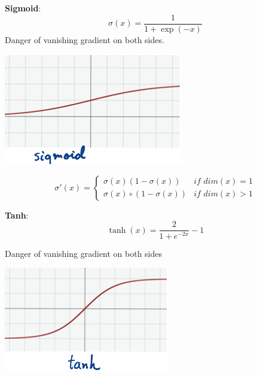 \begin{minipage}{0.45\columnwidth}
	\textbf{Sigmoid}: 
$$
	\sigma(x) = \frac{1}{1 + \exp(-x)}
$$
Danger of vanishing gradient on both sides.
\end{minipage}
\begin{minipage}{0.4\columnwidth}
		\includegraphics[width=\columnwidth]{images/10-sigmoid}
\end{minipage}

\begin{equation*}
	\sigma'(x) = 
	\begin{cases}
		\sigma(x)(1-\sigma(x)) &\textit{if dim$(x) = 1$} \\
		\sigma(x)\circ(1-\sigma(x))  &\textit{if dim$(x) > 1$}
	\end{cases}
\end{equation*}


\begin{minipage}{0.45\columnwidth}
	\textbf{Tanh}: 
$$
	\tanh(x) = \frac{2}{1 + e^{-2x}}-1
$$

Danger of vanishing gradient on both sides
\end{minipage}
\begin{minipage}{0.4\columnwidth}
		\includegraphics[width=\columnwidth]{images/10-tanh}
\end{minipage}
\vspace{1em}

